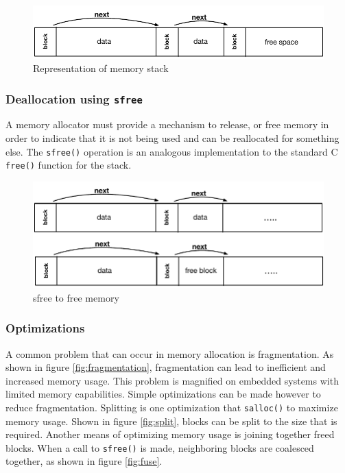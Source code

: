 \documentclass{sig-alternate}
\begin{document}
\begin{figure}[!htb]
\centering
\includegraphics[scale=.55]{figs/stack.pdf}
\caption{Representation of memory stack}
\end{figure}
\label{fig:stack}

\subsubsection{Deallocation using \texttt{sfree}}

A memory allocator must provide a mechanism to release, or free memory in order to indicate that it is not being used and can be reallocated for something else. The \texttt{sfree()} operation is an analogous implementation to the standard C \texttt{free()} function for the stack.

\begin{figure}[!htb]
\centering
\includegraphics[scale=.55]{figs/sfree.pdf}
\caption{sfree to free memory}
\end{figure}
\label{fig:free}
 
\subsubsection{Optimizations}

A common problem that can occur in memory allocation is fragmentation.  As shown in figure \ref{fig:fragmentation}, fragmentation can lead to inefficient and increased memory usage. This problem is magnified on embedded systems with limited memory capabilities. Simple optimizations can be made however to reduce fragmentation. Splitting is one optimization that \texttt{salloc()} to maximize memory usage. Shown in figure \ref{fig:split}, blocks can be split to the size that is required. Another means of optimizing memory usage is joining together freed blocks. When a call to \texttt{sfree()} is made, neighboring blocks are coalesced together, as shown in figure \ref{fig:fuse}.
\end{document}
